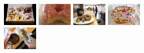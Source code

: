 \documentclass[10pt]{article}
\begin{document}
\begin{figure}[H]
				\vspace{5pt}
				\begin{subfigure}[b]{1.025\textwidth}
					\includegraphics[width=0.19\textwidth]{images/data/donut2/1.jpg}
					\includegraphics[width=0.19\textwidth]{images/data/donut2/2.png}
					\includegraphics[width=0.19\textwidth]{images/data/donut2/3.png}
					\includegraphics[width=0.19\textwidth]{images/data/donut2/4.jpg}
					\includegraphics[width=0.19\textwidth]{images/data/donut2/5.png}
				\end{subfigure}


\end{figure}
\end{document}
